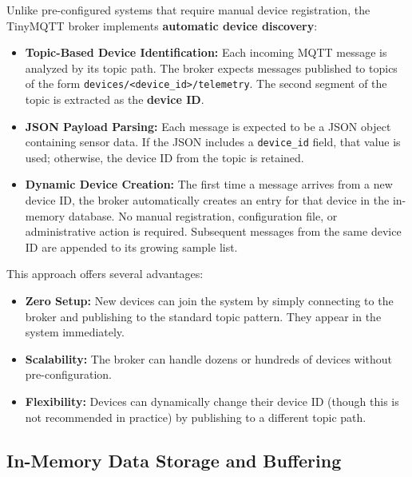 Unlike pre-configured systems that require manual device registration, the TinyMQTT broker implements \textbf{automatic device discovery}:
\begin{itemize}
  \item \textbf{Topic-Based Device Identification:} Each incoming MQTT message is analyzed by its topic path. The broker expects messages published to topics of the form \texttt{devices/<device\_id>/telemetry}. The second segment of the topic is extracted as the \textbf{device ID}.
  \item \textbf{JSON Payload Parsing:} Each message is expected to be a JSON object containing sensor data. If the JSON includes a \texttt{device\_id} field, that value is used; otherwise, the device ID from the topic is retained.
  \item \textbf{Dynamic Device Creation:} The first time a message arrives from a new device ID, the broker automatically creates an entry for that device in the in-memory database. No manual registration, configuration file, or administrative action is required. Subsequent messages from the same device ID are appended to its growing sample list.
\end{itemize}

This approach offers several advantages:
\begin{itemize}
  \item \textbf{Zero Setup:} New devices can join the system by simply connecting to the broker and publishing to the standard topic pattern. They appear in the system immediately.
  \item \textbf{Scalability:} The broker can handle dozens or hundreds of devices without pre-configuration.
  \item \textbf{Flexibility:} Devices can dynamically change their device ID (though this is not recommended in practice) by publishing to a different topic path.
\end{itemize}

\subsection*{In-Memory Data Storage and Buffering}


